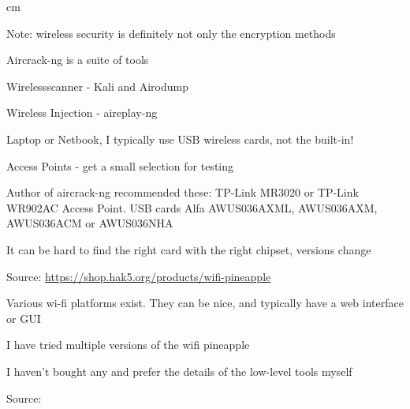 \documentclass[Screen16to9,17pt]{foils}
\begin{document}
 cm

\centerline{\hlkbig Note: wireless security is definitely not only the encryption methods}




\begin{list2}
\item Aircrack-ng is a suite of tools
\item Wirelessscanner - Kali and Airodump
\item Wireless Injection - aireplay-ng
\end{list2}





\begin{list1}
\item Laptop or Netbook, I typically use USB wireless cards, not the built-in!
\item Access Points - get a small selection for testing
\item Author of aircrack-ng recommended these:
TP-Link MR3020 or TP-Link WR902AC Access Point. USB cards Alfa AWUS036AXML, AWUS036AXM, AWUS036ACM or AWUS036NHA
\item It can be hard to find the right card with the right chipset, versions change
\end{list1}



Source: \url{https://shop.hak5.org/products/wifi-pineapple}

\begin{list2}
\item Various wi-fi platforms exist. They can be nice, and typically have a web interface or GUI
\item I have tried multiple versions of the wifi pineapple
\item I haven't bought any and prefer the details of the low-level tools myself
\end{list2}




Source: 




\end{document}
